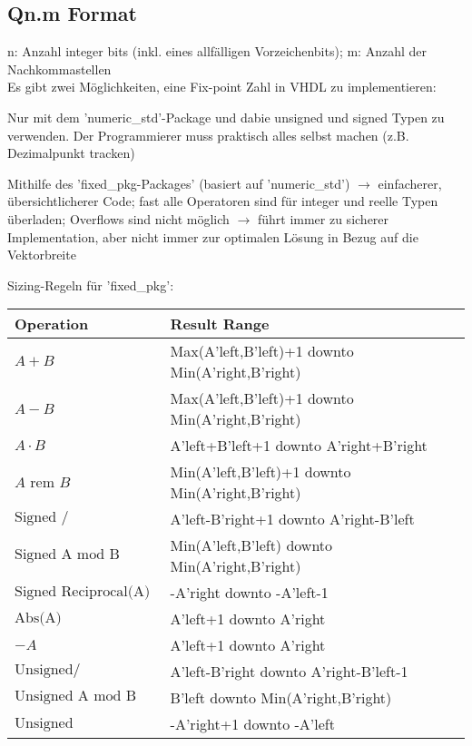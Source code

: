 \subsection{Qn.m Format}$~$ \\
n: Anzahl integer bits (inkl. eines allfälligen Vorzeichenbits); m: Anzahl der Nachkommastellen\\
Es gibt zwei Möglichkeiten, eine Fix-point Zahl in VHDL zu implementieren:
\begin{compactitem}
  \item Nur mit dem 'numeric\_std'-Package und dabie unsigned und signed Typen zu verwenden. Der Programmierer muss praktisch alles selbst machen (z.B. Dezimalpunkt tracken)
  \item Mithilfe des 'fixed\_pkg-Packages' (basiert auf 'numeric\_std') $\rightarrow$ einfacherer, übersichtlicherer Code; fast alle Operatoren sind für integer und reelle Typen überladen; Overflows sind nicht möglich $\rightarrow$ führt immer zu sicherer Implementation, aber nicht immer zur optimalen Lösung in Bezug auf die Vektorbreite
\end{compactitem}
Sizing-Regeln für 'fixed\_pkg':\\
\begin{tabular}{| l | l |}
\hline
Operation & Result Range\\
\hline
$A+B$ & Max(A'left,B'left)+1 downto Min(A'right,B'right)\\
\hline
$A-B$ & Max(A'left,B'left)+1 downto Min(A'right,B'right)\\
\hline
$A \cdot B$ & A'left+B'left+1 downto A'right+B'right\\
\hline
$A \text{ rem } B$ & Min(A'left,B'left)+1 downto Min(A'right,B'right)\\
\hline
$\text{Signed } /$ & A'left-B'right+1 downto A'right-B'left\\
\hline
$\text{Signed A mod B}$ & Min(A'left,B'left) downto Min(A'right,B'right)\\
\hline
$\text{Signed Reciprocal(A)}$ & -A'right downto -A'left-1\\
\hline
$\text{Abs(A)}$ & A'left+1 downto A'right\\
\hline
$-A$ & A'left+1 downto A'right\\
\hline
$\text{Unsigned} /$ & A'left-B'right downto A'right-B'left-1\\
\hline
$\text{Unsigned A mod B}$ & B'left downto Min(A'right,B'right)\\
\hline
$\text{Unsigned Reciprocal(A)}$ & -A'right+1 downto -A'left\\
\hline
\end{tabular}

